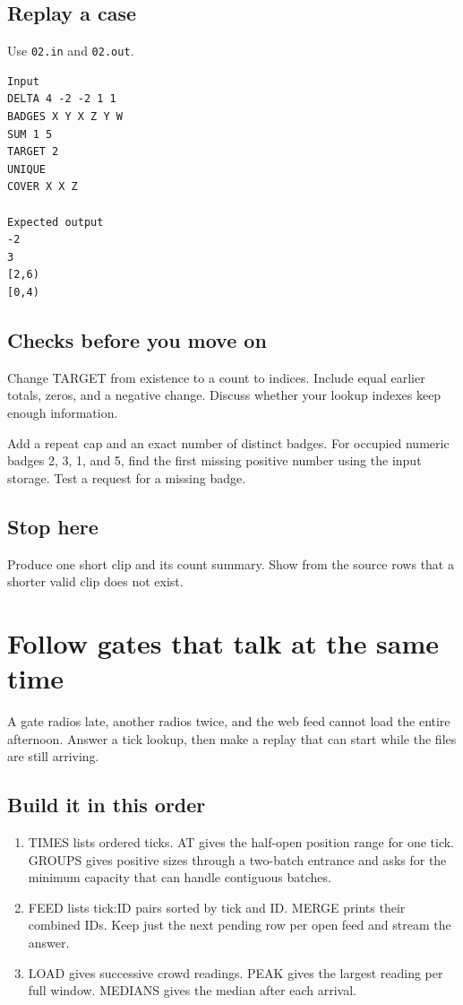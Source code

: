 \documentclass[11pt,letterpaper]{article}
\begin{document}
\subsection*{Replay a case}

Use \texttt{02.in} and \texttt{02.out}.

\begin{samepage}
\small
\begin{verbatim}
Input
DELTA 4 -2 -2 1 1
BADGES X Y X Z Y W
SUM 1 5
TARGET 2
UNIQUE
COVER X X Z

Expected output
-2
3
[2,6)
[0,4)
\end{verbatim}
\end{samepage}

\subsection*{Checks before you move on}

Change TARGET from existence to a count to indices. Include equal earlier totals, zeros, and a negative change. Discuss whether your lookup indexes keep enough information.

Add a repeat cap and an exact number of distinct badges. For occupied numeric badges 2, 3, 1, and 5, find the first missing positive number using the input storage. Test a request for a missing badge.

\subsection*{Stop here}

Produce one short clip and its count summary. Show from the source rows that a shorter valid clip does not exist.

\clearpage

\section{Follow gates that talk at the same time}\label{festival:03}

A gate radios late, another radios twice, and the web feed cannot load the entire afternoon. Answer a tick lookup, then make a replay that can start while the files are still arriving.

\subsection*{Build it in this order}

\begin{enumerate}
\item TIMES lists ordered ticks. AT gives the half-open position range for one tick. GROUPS gives positive sizes through a two-batch entrance and asks for the minimum capacity that can handle contiguous batches.
\item FEED lists tick:ID pairs sorted by tick and ID. MERGE prints their combined IDs. Keep just the next pending row per open feed and stream the answer.
\item LOAD gives successive crowd readings. PEAK gives the largest reading per full window. MEDIANS gives the median after each arrival.
\end{enumerate}
\end{document}
